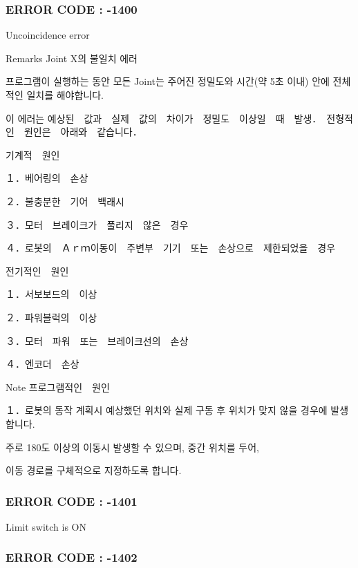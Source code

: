  \subsubsection*{E\-R\-R\-O\-R C\-O\-D\-E \-: -\/1400 }

Uncoincidence error \begin{DoxyRemark}{Remarks}
Joint X의 불일치 에러 \par
 프로그램이 실행하는 동안 모든 Joint는 주어진 정밀도와 시간(약 5초 이내) 안에 전체적인 일치를 해야합니다. \par
 이 에러는 예상된　값과　실제　값의　차이가　정밀도　이상일　때　발생．　전형적인　원인은　아래와　같습니다． \par
 기계적　원인 \par
 １．베어링의　손상 \par
 ２．불충분한　기어　백래시 \par
 ３．모터　브레이크가　풀리지　않은　경우 \par
 ４．로봇의　Ａｒｍ이동이　주변부　기기　또는　손상으로　제한되었을　경우 \par
 전기적인　원인 \par
 １．서보보드의　이상 \par
 ２．파워블럭의　이상 \par
 ３．모터　파워　또는　브레이크선의　손상 \par
 ４．엔코더　손상 
\end{DoxyRemark}
\begin{DoxyNote}{Note}
프로그램적인　원인 \par
 １．로봇의 동작 계획시 예상했던 위치와 실제 구동 후 위치가 맞지 않을 경우에 발생합니다. \par
 주로 180도 이상의 이동시 발생할 수 있으며, 중간 위치를 두어, \par
 이동 경로를 구체적으로 지정하도록 합니다.
\end{DoxyNote}


 \subsubsection*{E\-R\-R\-O\-R C\-O\-D\-E \-: -\/1401 }

Limit switch is O\-N



 \subsubsection*{E\-R\-R\-O\-R C\-O\-D\-E \-: -\/1402 }

